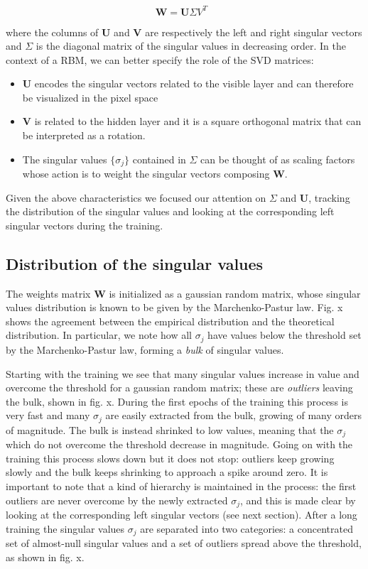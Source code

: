 \documentclass[twocolumn]{article}
\begin{document}
\begin{equation}
\textbf{W} = \textbf{U\(\Sigma V^T \) } 
\end{equation}

where the columns of \textbf{U} and \textbf{V} are respectively the left and right singular vectors and \textbf{\(\Sigma\)} is the diagonal matrix of the singular values in decreasing order. 
In the context of a RBM, we can better specify the role of the SVD matrices:

\begin{itemize}
\item \textbf{U} encodes the singular vectors related to the visible layer and can therefore be visualized in the pixel space
\item  \textbf{V} is related to the hidden layer and it is a square orthogonal matrix that can be interpreted as a rotation. 
\item The singular values \( \{ {\sigma}_j \} \) contained in \textbf{\(\Sigma\)} can be thought of as scaling factors whose action is to weight the singular vectors composing \textbf{W}.
\end{itemize}

Given the above characteristics we focused our attention on \textbf{\(\Sigma\)} and \textbf{U}, tracking the distribution of the singular values and looking at the corresponding left singular vectors during the training.

\subsection{Distribution of the singular values}
The weights matrix \(\textbf{W}\) is initialized as a gaussian random matrix, whose singular values distribution is known to be given by the Marchenko-Pastur law. Fig. x shows the agreement between the empirical distribution and the theoretical distribution. In particular, we note how all \(\sigma_j\) have values below the threshold set by the Marchenko-Pastur law, forming a \textit{bulk} of singular values.

Starting with the training we see that many singular values increase in value and overcome the threshold for a gaussian random matrix; these are \textit{outliers} leaving the bulk, shown in fig. x. During the first epochs of the training this process is very fast and many \(\sigma_j\) are easily extracted from the bulk, growing of many orders of magnitude. The bulk is instead shrinked to low values, meaning that the \(\sigma_j\) which do not overcome the threshold decrease in magnitude. Going on with the training this process slows down but it does not stop: outliers keep growing slowly and the bulk keeps shrinking to approach a spike around zero. It is important to note that a kind of hierarchy is maintained in the process: the first outliers are never overcome by the newly extracted \(\sigma_j\), and this is made clear by looking at the corresponding left singular vectors (see next section).
After a long training the singular values \(\sigma_j\) are separated into two categories: a concentrated set of almost-null singular values and a set of outliers spread above the threshold, as shown in fig. x.
\end{document}
